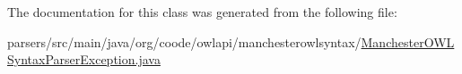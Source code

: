 The documentation for this class was generated from the following file\-:\begin{DoxyCompactItemize}
\item 
parsers/src/main/java/org/coode/owlapi/manchesterowlsyntax/\hyperlink{_manchester_o_w_l_syntax_parser_exception_8java}{Manchester\-O\-W\-L\-Syntax\-Parser\-Exception.\-java}\end{DoxyCompactItemize}
